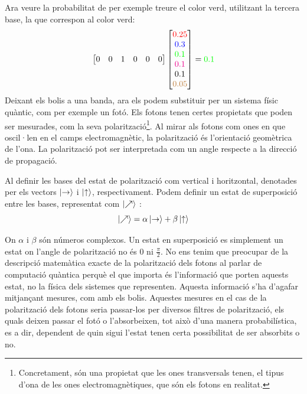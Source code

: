 Ara veure la probabilitat de per exemple treure el color verd, utilitzant la tercera base, la que correspon al color verd:
$$
\begin{bmatrix}
	0 & 0 & 1 & 0 & 0 & 0\\
\end{bmatrix}
\begin{bmatrix}
	\textcolor{red}{0.25} \\
	\textcolor{blue}{0.3 }\\
	\textcolor{green}{0.1 }\\
	\textcolor{magenta}{0.1 }\\
	\textcolor{black}{0.1 }\\
	\textcolor{brown}{0.05}
\end{bmatrix} = \textcolor{green}{0.1 }
$$
Deixant els bolis a una banda, ara els podem substituir per un sistema físic quàntic, com per exemple un fotó. Els fotons tenen certes propietats que poden ser mesurades, com la seva polarització\footnote{Concretament, són una propietat que les ones transversals tenen, el tipus d'ona de les ones electromagnètiques, que són els fotons en realitat.}. Al mirar als fotons com ones en que oscil·len en el camps electromagnètic, la polarització és l'orientació geomètrica de l'ona. La polarització pot ser interpretada com un angle respecte a la direcció de propagació. 

Al definir les bases del estat de polarització com vertical i horitzontal, denotades per els vectors $\ket{\text{\textrightarrow}}$ i $\ket{\text{\textuparrow}}$, respectivament. Podem definir un estat de superposició entre les bases, representat com $\ket{\nearrow}$ \cite{QC_intro:photon}: 
\begin{equation}
	\ket{\nearrow} = \alpha\ket{\text{\textrightarrow}} + \beta\ket{\text{\textuparrow}}
	\label{eq:photon_state}
\end{equation}

On $\alpha$ i $\beta$ són números complexos. 
Un estat en superposició es simplement un estat on l'angle de polarització no és $0$ ni $\frac{\pi}{2}$. No ens tenim que preocupar de la descripció matemàtica exacte de la polarització dels fotons al parlar de computació quàntica perquè el que importa és l'informació que porten aquests estat, no la física dels sistemes que representen. Aquesta informació s'ha d'agafar mitjançant mesures, com amb els bolis. Aquestes mesures en el cas de la polarització dels fotons seria passar-los per diversos filtres de polarització, els quals deixen passar el fotó o l'absorbeixen, tot això d'una manera probabilística, es a dir, dependent de quin sigui l'estat tenen certa possibilitat de ser absorbits o no.

